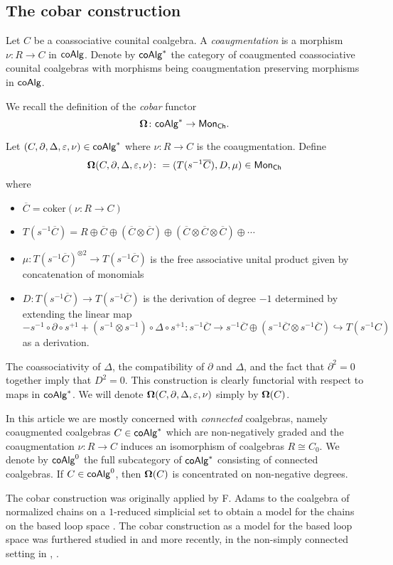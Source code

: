 

\subsection{The cobar construction}

Let $C$ be a coassociative counital coalgebra. A \textit{coaugmentation} is a morphism $\nu \colon R \to C$ in $\mathsf{coAlg}$.
Denote by $\mathsf{coAlg}^*$ the category of coaugmented coassociative counital coalgebras with morphisms being coaugmentation preserving morphisms in $\mathsf{coAlg}$. 

We recall the definition of the \textit{cobar} functor 
$$ \mathbf{\Omega} \colon \mathsf{coAlg}^* \to \mathsf{Mon}_{\mathsf{Ch}}.$$

Let  $(C, \partial, \Delta, \varepsilon, \nu)  \in \mathsf{coAlg}^*$ where $\nu \colon R \to C$ is the coaugmentation. Define
$$ \mathbf{\Omega}(C, \partial, \Delta, \varepsilon, \nu)  \colon= ( T(s^{-1}  \overline{C} ), D, \mu) \in \mathsf{Mon}_{\mathsf{Ch}}$$ where 
\begin{itemize}
\item $\overline{C}=\text{coker}(\nu \colon R \to C)$
\item $T(s^{-1} \overline{C})= R \oplus \overline{C} \oplus (\overline{C}  \otimes \overline{C} ) \oplus ( \overline{C} \otimes \overline{C} \otimes \overline{C} ) \oplus\cdots $
\item $\mu \colon T(s^{-1}  \overline{C} )^{\otimes 2} \to T(s^{-1}  \overline{C} ) $ is the free associative unital product given by concatenation of monomials
\item $D \colon T(s^{-1}  \overline{C} ) \to T(s^{-1}  \overline{C} )$ is the derivation of degree $-1$ determined by extending the linear map $$- s^{-1} \circ \partial \circ s^{+1} + (s^{-1} \otimes s^{-1}) \circ \Delta \circ s^{+1} \colon s^{-1}\overline{C} \to s^{-1}\overline{C} \oplus (s^{-1}\overline{C} \otimes s^{-1}\overline{C}) \hookrightarrow T(s^{-1}C)$$ as a derivation.
\end{itemize}

The coassociativity of $\Delta$, the compatibility of $\partial$ and $\Delta$, and the fact that $\partial^2 =0$ together imply that $D^2=0$. This construction is clearly functorial with respect to maps in $\mathsf{coAlg}^*$. We will denote $ \mathbf{\Omega} (C, \partial, \Delta, \varepsilon, \nu)$ simply by $ \mathbf{\Omega}(C)$. 

In this article we are mostly concerned with \textit{connected} coalgebras, namely coaugmented coalgebras $C \in \mathsf{coAlg}^*$ which are non-negatively graded and the coaugmentation $\nu \colon R \to C$ induces an isomorphism of coalgebras $R \cong C_0$. We denote by $\mathsf{coAlg}^0$ the full subcategory of $\mathsf{coAlg}^*$ consisting of connected coalgebras. If $C \in \mathsf{coAlg}^0$, then $ \mathbf{\Omega}(C)$ is concentrated on non-negative degrees. 

The cobar construction was originally applied by F. Adams to the coalgebra of normalized chains on a $1$-reduced simplicial set to obtain a model for the chains on the based loop space \cite{Adams}. The cobar construction as a model for the based loop space was furthered studied in \cite{Baues} and more recently, in the non-simply connected setting in \cite{Hess-Tonks}, \cite{rivera-zeinalian-cubical}.
